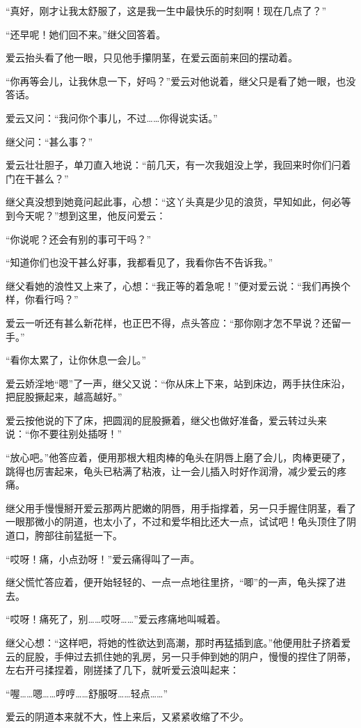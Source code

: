 \documentclass[12pt,UTF8]{ctexbook}
\begin{document}
“真好，刚才让我太舒服了，这是我一生中最快乐的时刻啊！现在几点了？”

“还早呢！她们回不来。”继父回答着。

爱云抬头看了他一眼，只见他手攥阴茎，在爱云面前来回的摆动着。

“你再等会儿，让我休息一下，好吗？”爱云对他说着，继父只是看了她一眼，也没答话。

爱云又问：“我问你个事儿，不过……你得说实话。”

继父问：“甚么事？”

爱云壮壮胆子，单刀直入地说：“前几天，有一次我姐没上学，我回来时你们闩着门在干甚么？”

继父真没想到她竟问起此事，心想：“这丫头真是少见的浪货，早知如此，何必等到今天呢？”想到这里，他反问爱云：

“你说呢？还会有别的事可干吗？”

“知道你们也没干甚么好事，我都看见了，我看你告不告诉我。”

继父看她的浪性又上来了，心想：“我正等的着急呢！”便对爱云说：“我们再换个样，你看行吗？”

爱云一听还有甚么新花样，也正巴不得，点头答应：“那你刚才怎不早说？还留一手。”

“看你太累了，让你休息一会儿。”

爱云娇淫地“嗯”了一声，继父又说：“你从床上下来，站到床边，两手扶住床沿，把屁股撅起来，越高越好。”

爱云按他说的下了床，把圆润的屁股撅着，继父也做好准备，爱云转过头来说：“你不要往别处插呀！”

“放心吧。”他答应着，便用那根大粗肉棒的龟头在阴唇上磨了会儿，肉棒更硬了，跳得也厉害起来，龟头已粘满了粘液，让一会儿插入时好作润滑，减少爱云的疼痛。

继父用手慢慢掰开爱云那两片肥嫩的阴唇，用手指撑着，另一只手握住阴茎，看了一眼那微小的阴道，也太小了，不过和爱华相比还大一点，试试吧！龟头顶住了阴道口，胯部往前猛挺一下。

“哎呀！痛，小点劲呀！”爱云痛得叫了一声。

继父慌忙答应着，便开始轻轻的、一点一点地往里挤，“唧”的一声，龟头探了进去。

“哎呀！痛死了，别……哎呀……”爱云疼痛地叫喊着。

继父心想：“这样吧，将她的性欲达到高潮，那时再猛插到底。”他便用肚子挤着爱云的屁股，手伸过去抓住她的乳房，另一只手伸到她的阴户，慢慢的捏住了阴蒂，左右开弓揉捏着，刚搓揉了几下，就听爱云浪叫起来：

“喔……嗯……哼哼……舒服呀……轻点……”

爱云的阴道本来就不大，性上来后，又紧紧收缩了不少。
\end{document}
